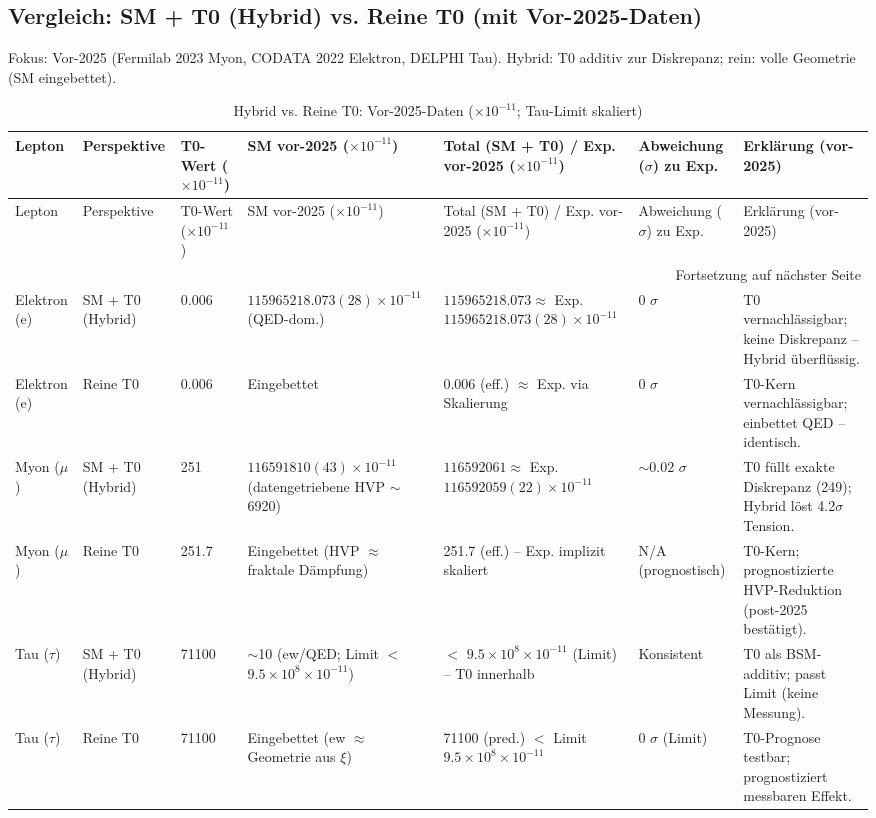 \documentclass[12pt,a4paper]{article}
\begin{document}
	\subsection{Vergleich: SM + T0 (Hybrid) vs. Reine T0 (mit Vor-2025-Daten)}
	
	Fokus: Vor-2025 (Fermilab 2023 Myon, CODATA 2022 Elektron, DELPHI Tau). Hybrid: T0 additiv zur Diskrepanz; rein: volle Geometrie (SM eingebettet).
	
	\begin{longtable}{p{1.5cm}p{2cm}p{1.2cm}p{3cm}p{3cm}p{1.8cm}p{2.8cm}}
		\caption{Hybrid vs. Reine T0: Vor-2025-Daten ($ \times 10^{-11}$; Tau-Limit skaliert)} \label{tab:hybrid_pure}\\
		\toprule
		Lepton & Perspektive & T0-Wert ($ \times 10^{-11}$) & SM vor-2025 ($ \times 10^{-11}$) & Total (SM + T0) / Exp. vor-2025 ($ \times 10^{-11}$) & Abweichung ($\sigma$) zu Exp. & Erklärung (vor-2025) \\
		\midrule
		\endfirsthead
		
		\toprule
		Lepton & Perspektive & T0-Wert ($ \times 10^{-11}$) & SM vor-2025 ($ \times 10^{-11}$) & Total (SM + T0) / Exp. vor-2025 ($ \times 10^{-11}$) & Abweichung ($\sigma$) zu Exp. & Erklärung (vor-2025) \\
		\midrule
		\endhead
		
		\bottomrule
		\multicolumn{7}{r}{Fortsetzung auf nächster Seite} \\
		\endfoot
		
		Elektron (e) & SM + T0 (Hybrid) & 0.006 & $115965218.073(28) \times 10^{-11}$ (QED-dom.) & $115965218.073 \approx$ Exp. $115965218.073(28) \times 10^{-11}$ & 0 $\sigma$ & T0 vernachlässigbar; keine Diskrepanz -- Hybrid überflüssig. \\
		Elektron (e) & Reine T0 & 0.006 & Eingebettet & 0.006 (eff.) $\approx$ Exp. via Skalierung & 0 $\sigma$ & T0-Kern vernachlässigbar; einbettet QED -- identisch. \\
		Myon ($\mu$) & SM + T0 (Hybrid) & 251 & $116591810(43) \times 10^{-11}$ (datengetriebene HVP $\sim$6920) & $116592061 \approx$ Exp. $116592059(22) \times 10^{-11}$ & $\sim$0.02 $\sigma$ & T0 füllt exakte Diskrepanz (249); Hybrid löst 4.2$\sigma$ Tension. \\
		Myon ($\mu$) & Reine T0 & 251.7 & Eingebettet (HVP $\approx$ fraktale Dämpfung) & 251.7 (eff.) -- Exp. implizit skaliert & N/A (prognostisch) & T0-Kern; prognostizierte HVP-Reduktion (post-2025 bestätigt). \\
		Tau ($\tau$) & SM + T0 (Hybrid) & 71100 & $\sim$10 (ew/QED; Limit $<$ $9.5\times10^{8} \times 10^{-11}$) & $<$ $9.5\times10^{8} \times 10^{-11}$ (Limit) -- T0 innerhalb & Konsistent & T0 als BSM-additiv; passt Limit (keine Messung). \\
		Tau ($\tau$) & Reine T0 & 71100 & Eingebettet (ew $\approx$ Geometrie aus $\xi$) & 71100 (pred.) $<$ Limit $9.5\times10^{8} \times 10^{-11}$ & 0 $\sigma$ (Limit) & T0-Prognose testbar; prognostiziert messbaren Effekt. \\
	\end{longtable}
	
\end{document}
